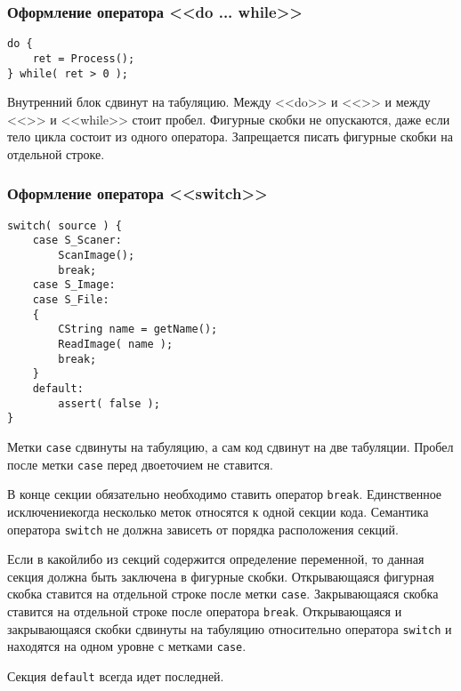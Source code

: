 {{{%
\subsubsection{Оформление оператора <<do ... while>>}

\begin{lstlisting}[frame=single]
do {
    ret = Process();
} while( ret > 0 );
\end{lstlisting}

Внутренний блок сдвинут на табуляцию. Между <<do>> и <<{>> и между <<}>> и <<while>> стоит пробел. Фигурные скобки не опускаются, даже если тело цикла состоит из одного оператора. Запрещается писать фигурные скобки на отдельной строке.

\newpage
\subsubsection{Оформление оператора <<switch>>}

\begin{lstlisting}[frame=single]
switch( source ) {
    case S_Scaner:
        ScanImage();
        break;
    case S_Image:
    case S_File: 
    {
        CString name = getName();
        ReadImage( name );
        break; 
    }
    default:
        assert( false );
}
\end{lstlisting}

Метки \lstinline|case| сдвинуты на табуляцию, а сам код сдвинут на две табуляции. Пробел после метки \lstinline|case| перед двоеточием не ставится.

В конце секции обязательно необходимо ставить оператор \lstinline|break|. Единственное исключение\mdash когда несколько меток относятся к одной секции кода. Семантика оператора \lstinline|switch| не должна зависеть от порядка расположения секций.

Если в какой\sdash либо из секций содержится определение переменной, то данная секция должна быть заключена в фигурные скобки. Открывающаяся фигурная скобка ставится на отдельной строке после метки \lstinline|case|. Закрывающаяся скобка ставится на отдельной строке после оператора \lstinline|break|. Открывающаяся и закрывающаяся скобки сдвинуты на табуляцию относительно оператора \lstinline|switch| и находятся на одном уровне с метками \lstinline|case|.

Секция \lstinline|default| всегда идет последней.

}}}
